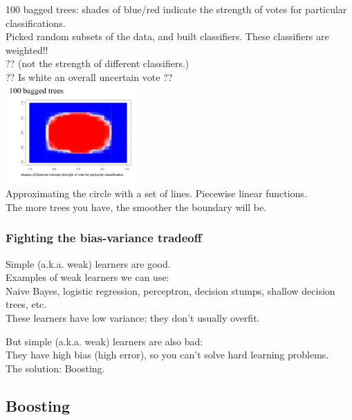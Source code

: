 100 bagged trees:  shades of blue/red indicate the strength of votes for particular classifications. \hfill \\
Picked random subsets of the data, and built classifiers.  These classifiers are weighted!! \hfill \\  %
?? (not the strength of different classifiers.)   \hfill \\ 
?? Is white an overall uncertain vote ??   \hfill \\ 
\includegraphics[width=2in]{figures/100_bagged_trees.pdf} \hfill \\
Approximating the circle with a set of lines.  Piecewise linear functions. \hfill \\ %
The more trees you have, the smoother the boundary will be. 

\subsubsection{Fighting the bias-variance tradeoff}
Simple (a.k.a. weak) learners are good. \hfill \\ 
Examples of weak learners we can use: \hfill \\ 
Naive Bayes, logistic regression, perceptron, decision stumps, shallow decision trees, etc. \hfill \\ 
These learners have low variance; they don't usually overfit. 

But simple (a.k.a. weak) learners are also bad: \hfill \\ 
They have high bias (high error), so you can't solve hard learning problems. \hfill \\ 

The solution: Boosting. 

\subsection{Boosting}

